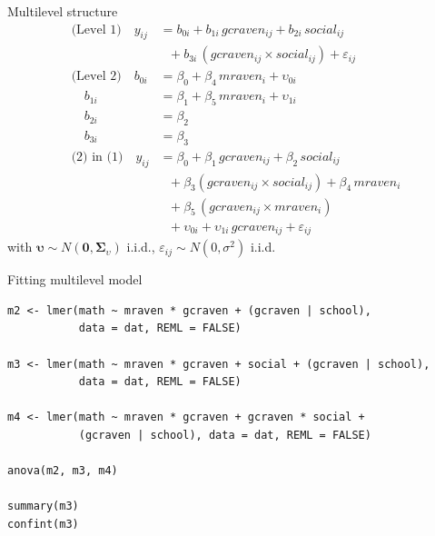 \documentclass[aspectratio=169]{beamer}
\begin{document}
\begin{frame}{Multilevel structure}
\begin{align*}
\text{(Level 1)} \quad y_{ij} &= b_{0i} + b_{1i}\,gcraven_{ij} + b_{2i}\,social_{ij}\\
                            &~~~ + b_{3i}\,(gcraven_{ij}\times social_{ij}) + \varepsilon_{ij}\\
\text{(Level 2)} \quad b_{0i} &= \beta_0 + \beta_4\,mraven_i + \upsilon_{0i} \\
                 \quad b_{1i} &= \beta_1 + \beta_5\,mraven_i + \upsilon_{1i}\\
                 \quad b_{2i} &= \beta_2\\
                 \quad b_{3i} &= \beta_3\\
\text{(2) in (1)} \quad y_{ij} &= \beta_{0} + \beta_{1}\,gcraven_{ij} + \beta_{2}\,social_{ij}\\
                            &~~~ + \beta_{3}(gcraven_{ij}\times social_{ij}) + \beta_{4}\,mraven_i\\
                            &~~~ + \beta_{5}\,(gcraven_{ij} \times mraven_{i})\\
                            &~~~ + \upsilon_{0i} + \upsilon_{1i}\,gcraven_{ij} + \varepsilon_{ij}
\end{align*}
with $\boldsymbol\upsilon \sim N(\boldsymbol 0, \boldsymbol{\Sigma}_\upsilon)$ i.i.d.,
$\varepsilon_{ij} \sim N(0, \sigma^2)$ i.i.d.
\end{frame}

\begin{frame}[fragile]{Fitting multilevel model}
  \begin{lstlisting}
m2 <- lmer(math ~ mraven * gcraven + (gcraven | school),
           data = dat, REML = FALSE)

m3 <- lmer(math ~ mraven * gcraven + social + (gcraven | school),
           data = dat, REML = FALSE)

m4 <- lmer(math ~ mraven * gcraven + gcraven * social +
           (gcraven | school), data = dat, REML = FALSE)

anova(m2, m3, m4)

summary(m3)
confint(m3)
  \end{lstlisting}
\end{frame}
\end{document}
